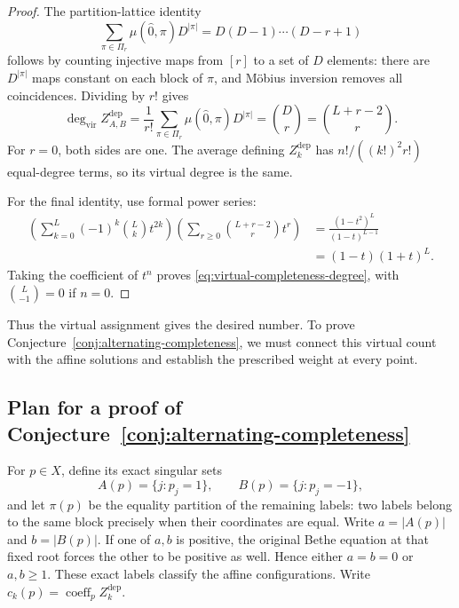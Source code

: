 \documentclass[11pt]{article}
\theoremstyle{definition}
\begin{document}
\begin{proof}
The partition-lattice identity
\[
 \sum_{\pi\in\Pi_r}\mu(\hat0,\pi)D^{|\pi|}
 =D(D-1)\cdots(D-r+1)
\]
follows by counting injective maps from $[r]$ to a set of $D$ elements:
there are $D^{|\pi|}$ maps constant on each block of $\pi$, and
M\"obius inversion removes all coincidences. Dividing by $r!$ gives
\[
 \deg_{\mathrm{vir}}Z^{\mathrm{dep}}_{A,B}
 =\frac1{r!}\sum_{\pi\in\Pi_r}\mu(\hat0,\pi)D^{|\pi|}
 =\binom Dr=\binom{L+r-2}{r}.
\]
For $r=0$, both sides are one. The average defining
$Z^{\mathrm{dep}}_k$ has $n!/((k!)^2r!)$ equal-degree terms, so its
virtual degree is the same.

For the final identity, use formal power series:
\[
 \begin{aligned}
 \left(\sum_{k=0}^L(-1)^k\binom Lk t^{2k}\right)
 \left(\sum_{r\ge0}\binom{L+r-2}{r}t^r\right)
 &=\frac{(1-t^2)^L}{(1-t)^{L-1}}\\
 &=(1-t)(1+t)^L.
 \end{aligned}
\]
Taking the coefficient of $t^n$ proves
\eqref{eq:virtual-completeness-degree}, with
$\binom L{-1}=0$ if $n=0$.
\end{proof}

Thus the virtual assignment gives the desired number. To prove
Conjecture~\ref{conj:alternating-completeness}, we must connect this
virtual count with the affine solutions and establish the prescribed
weight at every point.

\subsection{Plan for a proof of Conjecture~\ref{conj:alternating-completeness}}\label{section:plan}
For $p\in X$, define its exact singular sets
\[
 A(p)=\{j:p_j=1\},\qquad B(p)=\{j:p_j=-1\},
\]
and let $\pi(p)$ be the equality partition of the remaining labels:
two labels belong to the same block precisely when their coordinates
are equal. Write $a=|A(p)|$ and $b=|B(p)|$. If one of $a,b$ is
positive, the original Bethe equation at that fixed root forces the
other to be positive as well. Hence either $a=b=0$ or $a,b\ge1$.
These exact labels classify the affine configurations. Write
$c_k(p)=\operatorname{coeff}_p Z^{\mathrm{dep}}_k$.
\end{document}

